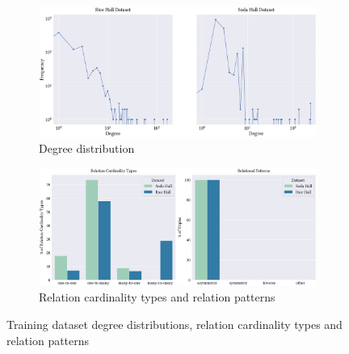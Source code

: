\begin{figure}[!ht]
    \centering
    \begin{subfigure}[b]{1\textwidth}
        \includegraphics[width=\textwidth]{figures/Degree-distribution.eps}
        \caption{Degree distribution}
        \label{subfig:degree_distribution}
    \end{subfigure}
    \vspace{1em}
    \begin{subfigure}[b]{1\textwidth}
        \includegraphics[width=\textwidth]{figures/kg-characteristics.eps}
        \caption{Relation cardinality types and relation patterns}
        \label{subfig:relation_cardinality_types_and_relation_patterns}
    \end{subfigure}
    \caption{Training dataset degree distributions, relation cardinality types and relation patterns }
    \label{fig:graph_characteristics}
\end{figure}

